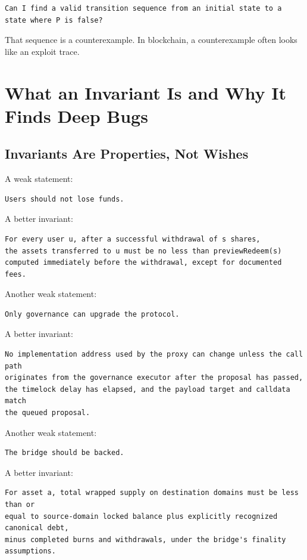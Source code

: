 \begin{lstlisting}
Can I find a valid transition sequence from an initial state to a state where P is false?
\end{lstlisting}

That sequence is a counterexample. In blockchain, a counterexample often
looks like an exploit trace.

\section{What an Invariant Is and Why It Finds Deep Bugs}

\subsection{Invariants Are Properties, Not Wishes}

A weak statement:

\begin{lstlisting}
Users should not lose funds.
\end{lstlisting}

A better invariant:

\begin{lstlisting}
For every user u, after a successful withdrawal of s shares,
the assets transferred to u must be no less than previewRedeem(s)
computed immediately before the withdrawal, except for documented fees.
\end{lstlisting}

Another weak statement:

\begin{lstlisting}
Only governance can upgrade the protocol.
\end{lstlisting}

A better invariant:

\begin{lstlisting}
No implementation address used by the proxy can change unless the call path
originates from the governance executor after the proposal has passed,
the timelock delay has elapsed, and the payload target and calldata match
the queued proposal.
\end{lstlisting}

Another weak statement:

\begin{lstlisting}
The bridge should be backed.
\end{lstlisting}

A better invariant:

\begin{lstlisting}
For asset a, total wrapped supply on destination domains must be less than or
equal to source-domain locked balance plus explicitly recognized canonical debt,
minus completed burns and withdrawals, under the bridge's finality assumptions.
\end{lstlisting}

